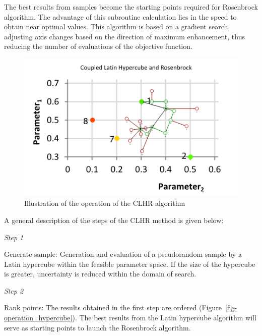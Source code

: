 \documentclass[
  letterpaper,
  DIV=11,
  numbers=noendperiod]{scrreprt}
\begin{document}
The best results from samples become the starting points required for
Rosenbrock algorithm. The advantage of this subroutine calculation lies
in the speed to obtain near optimal values. This algorithm is based on a
gradient search, adjusting axis changes based on the direction of
maximum enhancement, thus reducing the number of evaluations of the
objective function.

\begin{figure}

{\centering \includegraphics{./figures/fig-operation_clhr.png}

}

\caption{\label{fig-operation_clhr}Illustration of the operation of the
CLHR algorithm}

\end{figure}

A general description of the steps of the CLHR method is given below:

\emph{Step 1}

Generate sample: Generation and evaluation of a pseudorandom sample by a
Latin hypercube within the feasible parameter space. If the size of the
hypercube is greater, uncertainty is reduced within the domain of
search.

\emph{Step 2}

Rank points: The results obtained in the first step are ordered
(Figure~\ref{fig-operation_hypercube}). The best results from the Latin
hypercube algorithm will serve as starting points to launch the
Rosenbrock algorithm.
\end{document}
